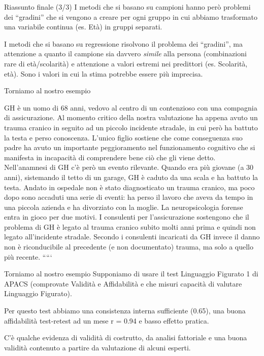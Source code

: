 \documentclass[
  ignorenonframetext,
  aspectratio=169,
]{beamer}
\begin{document}
\begin{frame}{Riassunto finale (3/3)}
\label{riassunto-finale-33}
I metodi che si basano su campioni hanno però problemi dei ``gradini''
che si vengono a creare per ogni gruppo in cui abbiamo trasformato una
variabile continua (es. Età) in gruppi separati.

I metodi che si basano su regressione risolvono il problema dei
``gradini'', ma attenzione a quanto il campione sia davvero
\emph{simile} alla persona (combinazioni rare di età/scolarità) e
attenzione a valori estremi nei predittori (es. Scolarità, età). Sono i
valori in cui la stima potrebbe essere più imprecisa.
\end{frame}

\begin{frame}{Torniamo al nostro esempio}
\label{torniamo-al-nostro-esempio}
\scriptsize

GH è un uomo di 68 anni, vedovo al centro di un contenzioso con una
compagnia di assicurazione. Al momento critico della nostra valutazione
ha appena avuto un trauma cranico in seguito ad un piccolo incidente
stradale, in cui però ha battuto la testa e perso conoscenza. L'unico
figlio sostiene che come conseguenza suo padre ha avuto un importante
peggioramento nel funzionamento cognitivo che si manifesta in incapacità
di comprendere bene ciò che gli viene detto. Nell'anamnesi di GH c'è
però un evento rilevante. Quando era più giovane (a 30 anni), sistemando
il tetto di un garage, GH è caduto da una scala e ha battuto la testa.
Andato in ospedale non è stato diagnosticato un trauma cranico, ma poco
dopo sono accaduti una serie di eventi: ha perso il lavoro che aveva da
tempo in una piccola azienda e ha divorziato con la moglie. La
neuropsicologia forense entra in gioco per due motivi. I consulenti per
l'assicurazione sostengono che il problema di GH è legato al trauma
cranico subito molti anni prima e quindi non legato all'incidente
stradale. Secondo i consulenti incaricati da GH invece il danno non è
riconducibile al precedente (e non documentato) trauma, ma solo a quello
più recente. `````
\end{frame}

\begin{frame}{Torniamo al nostro esempio}
\label{torniamo-al-nostro-esempio-1}
Supponiamo di usare il test Linguaggio Figurato 1 di APACS (comprovate
Validità e Affidabilità e che misuri capacità di valutare Linguaggio
Figurato).

Per questo test abbiamo una consistenza interna sufficiente (0.65), una
buona affidabilità test-retest ad un mese r = 0.94 e basso effetto
pratica.

C'è qualche evidenza di validità di costrutto, da analisi fattoriale e
una buona validità contenuto a partire da valutazione di alcuni esperti.
\end{frame}
\end{document}
